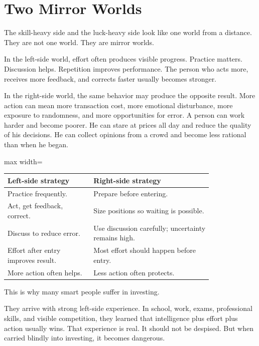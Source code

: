 \section*{Two Mirror Worlds}

The skill-heavy side and the luck-heavy side look like one world from a distance. They are not one world. They are mirror worlds.

In the left-side world, effort often produces visible progress. Practice matters. Discussion helps. Repetition improves performance. The person who acts more, receives more feedback, and corrects faster usually becomes stronger.

In the right-side world, the same behavior may produce the opposite result. More action can mean more transaction cost, more emotional disturbance, more exposure to randomness, and more opportunities for error. A person can work harder and become poorer. He can stare at prices all day and reduce the quality of his decisions. He can collect opinions from a crowd and become less rational than when he began.

\begin{center}
\begin{adjustbox}{max width=\linewidth}
\begin{tabular}{p{0.34\linewidth}p{0.47\linewidth}}
\hline
Left-side strategy & Right-side strategy \\
\hline
Practice frequently. & Prepare before entering. \\
Act, get feedback, correct. & Size positions so waiting is possible. \\
Discuss to reduce error. & Use discussion carefully; uncertainty remains high. \\
Effort after entry improves result. & Most effort should happen before entry. \\
More action often helps. & Less action often protects. \\
\hline
\end{tabular}
\end{adjustbox}
\end{center}

This is why many smart people suffer in investing.

They arrive with strong left-side experience. In school, work, exams, professional skills, and visible competition, they learned that intelligence plus effort plus action usually wins. That experience is real. It should not be despised. But when carried blindly into investing, it becomes dangerous.

